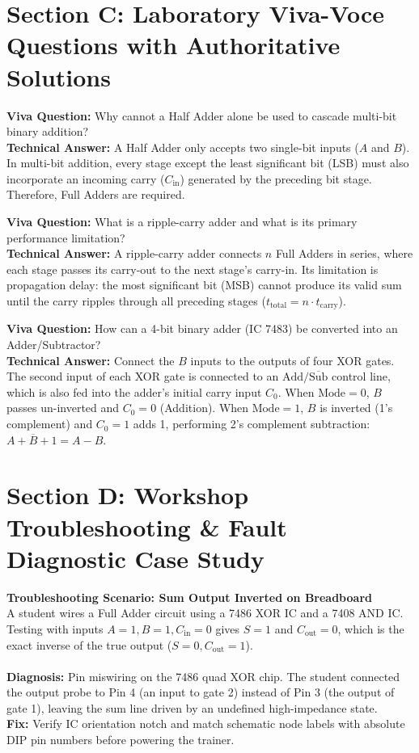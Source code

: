 \section{Section C: Laboratory Viva-Voce Questions with Authoritative Solutions}

\noindent\textbf{Viva Question:} Why cannot a Half Adder alone be used to cascade multi-bit binary addition?\\
\textbf{Technical Answer:} A Half Adder only accepts two single-bit inputs ($A$ and $B$). In multi-bit addition, every stage except the least significant bit (LSB) must also incorporate an incoming carry ($C_{\mathrm{in}}$) generated by the preceding bit stage. Therefore, Full Adders are required.
\vspace{3mm}

\noindent\textbf{Viva Question:} What is a ripple-carry adder and what is its primary performance limitation?\\
\textbf{Technical Answer:} A ripple-carry adder connects $n$ Full Adders in series, where each stage passes its carry-out to the next stage's carry-in. Its limitation is propagation delay: the most significant bit (MSB) cannot produce its valid sum until the carry ripples through all preceding stages ($t_{\mathrm{total}} = n \cdot t_{\mathrm{carry}}$).
\vspace{3mm}

\noindent\textbf{Viva Question:} How can a 4-bit binary adder (IC 7483) be converted into an Adder/Subtractor?\\
\textbf{Technical Answer:} Connect the $B$ inputs to the outputs of four XOR gates. The second input of each XOR gate is connected to an $\text{Add}/\overline{\text{Sub}}$ control line, which is also fed into the adder's initial carry input $C_0$. When $\text{Mode} = 0$, $B$ passes un-inverted and $C_0 = 0$ (Addition). When $\text{Mode} = 1$, $B$ is inverted (1's complement) and $C_0 = 1$ adds 1, performing 2's complement subtraction: $A + \overline{B} + 1 = A - B$.
\vspace{3mm}


\section{Section D: Workshop Troubleshooting \& Fault Diagnostic Case Study}

\textbf{Troubleshooting Scenario: Sum Output Inverted on Breadboard}\\
A student wires a Full Adder circuit using a 7486 XOR IC and a 7408 AND IC. Testing with inputs $A=1, B=1, C_{\mathrm{in}}=0$ gives $S=1$ and $C_{\mathrm{out}}=0$, which is the exact inverse of the true output ($S=0, C_{\mathrm{out}}=1$).\\\\
\textbf{Diagnosis:} Pin miswiring on the 7486 quad XOR chip. The student connected the output probe to Pin 4 (an input to gate 2) instead of Pin 3 (the output of gate 1), leaving the sum line driven by an undefined high-impedance state.\\
\textbf{Fix:} Verify IC orientation notch and match schematic node labels with absolute DIP pin numbers before powering the trainer.
\vspace{4mm}
